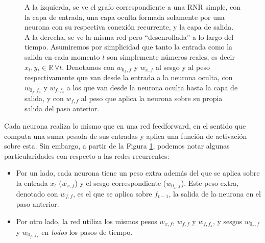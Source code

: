 \documentclass[../../main.tex]{subfiles}
\begin{document}
\begin{figure}[ht]
    \caption{A la izquierda, se ve el grafo correspondiente a una RNR simple, con la capa
    de entrada, una capa oculta formada solamente por una neurona con su respectiva
    conexión recurrente, y la capa de salida. A la derecha, se ve la misma red pero
    ``desenrollada'' a lo largo del tiempo. Asumiremos por simplicidad que tanto la
    entrada como la salida en cada momento \(t\) son simplemente números reales, es decir
    \(x_t, y_t \in \mathbb{R} \ \forall t\). Denotamos con \(w_{0_x,f}\) y \(w_{x,f}\) al
    sesgo y al peso respectivamente que van desde la entrada a la neurona oculta, con
    \(w_{0_f,f_s}\) y \(w_{f,f_s}\) a los que van desde la neurona oculta hasta la capa de
    salida, y con \(w_{f,f}\) al peso que aplica la neurona sobre su propia salida del
    paso anterior.}
    \label{fig:simple-rnn}
\end{figure}

Cada neurona realiza lo mismo que en una red feedforward, en el sentido que computa una
suma pesada de sus entradas y aplica una función de activación sobre esta. Sin embargo, a
partir de la Figura \ref{fig:simple-rnn}, podemos notar algunas particularidades con
respecto a las redes recurrentes:
\begin{itemize}
    \item Por un lado, cada neurona tiene un peso extra además del que se aplica sobre la
    entrada \(x_t\) (\(w_{x,f}\)) y el sesgo correspondiente (\(w_{0_x,f}\)). Este peso
    extra, denotado con \(w_{f,f}\), es el que se aplica sobre \(f_{t-1}\), la salida de
    la neurona en el paso anterior.
    \item Por otro lado, la red utiliza los mismos pesos \(w_{x,f}\), \(w_{f,f}\) y
    \(w_{f, f_s}\), y sesgos \(w_{0_x,f}\) y \(w_{0_f, f_s}\) en \textit{todos} los pasos
    de tiempo.
\end{itemize}
\end{document}
